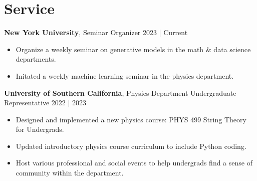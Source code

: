 \documentclass[a4paper,9pt]{extarticle}
\begin{document}
\section*{Service}

\textbf{New York University}, Seminar Organizer \hfill 2023 | Current
\begin{itemize}
    \item Organize a weekly seminar on generative models in the math \& data science departments.
    \item Initated a weekly machine learning seminar in the physics department.
\end{itemize}

\noindent
\textbf{University of Southern California}, Physics Department Undergraduate Representative \hfill 2022 | 2023
\begin{itemize}
    \item Designed and implemented a new physics course: PHYS 499 String Theory for Undergrads.
    \item Updated introductory physics course curriculum to include Python coding.
    \item Host various professional and social events to help undergrads find a sense of community within the department. 
\end{itemize}
\end{document}
